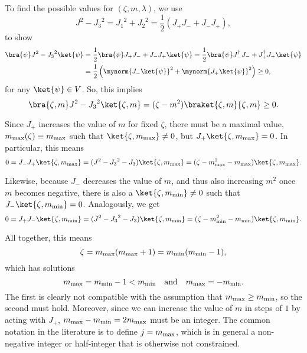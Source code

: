 To find the possible values for $(\zeta, m, \lambda)$, we use
\begin{equation*}
    J^2 - {J_3}^2 = {J_1}^2 + {J_2}^2 = \frac{1}{2} (J_+ J_- + J_- J_+),
\end{equation*}
to show
\begin{equation*}
\begin{split}
    \bra{\psi} J^2 - {J_3}^2 \ket{\psi} &= \frac{1}{2} \bra{\psi} J_+ J_- + J_- J_+ \ket{\psi} = \frac{1}{2} \bra{\psi} J^\dagger_- J_- + J_+^\dagger J_+ \ket{\psi} \\ &= \frac{1}{2} \left( \mynorm{J_- \ket{\psi}}^2 + \mynorm{J_+ \ket{\psi}}^2  \right) \geq 0 ,
\end{split}
\end{equation*}
for any $\ket{\psi} \in V$. So, this implies
\begin{equation*}
    \bra{\zeta, m } J^2 - {J_3}^2 \ket{\zeta,m} = (\zeta - m^2) \braket{\zeta,m}{\zeta,m} \geq 0 .
\end{equation*}

Since $J_+$ increases the value of $m$ for fixed $\zeta$, there must be a maximal value, $m_\textup{max}(\zeta) \equiv m_\textup{max}$ such that $\ket{\zeta, m_\textup{max}} \neq 0$, but $J_+ \ket{\zeta, m_\textup{max}} = 0$. In particular, this means
\begin{equation*}
    0 = J_- J_+ \ket{\zeta, m_\textup{max}} = (J^2 - {J_3}^2 - J_3) \ket{\zeta, m_\textup{max}} = (\zeta - m^2_\textup{max} - m_\textup{max}) \ket{\zeta, m_\textup{max}} .
\end{equation*}

Likewise, because $J_-$ decreases the value of $m$, and thus also increasing $m^2$ once $m$ becomes negative, there is also a $\ket{\zeta, m_\textup{min}} \neq 0$ such that $J_- \ket{\zeta, m_\textup{min}} = 0$. Analogously, we get
\begin{equation*}
    0 = J_+ J_- \ket{\zeta, m_\textup{min}} = (J^2 - {J_3}^2 - J_3) \ket{\zeta, m_\textup{min}} = (\zeta - m^2_\textup{min} - m_\textup{min}) \ket{\zeta, m_\textup{min}} .
\end{equation*}

All together, this means
\begin{equation}
    \zeta = m_\textup{max} (m_\textup{max} + 1) = m_\textup{min} (m_\textup{min} - 1),
\end{equation}
which has solutions
\begin{equation*}
    m_\textup{max} = m_\textup{min} - 1 < m_\textup{min} \quad \textup{and} \quad m_\textup{max} = - m_\textup{min}.
\end{equation*}
The first is clearly not compatible with the assumption that $m_\textup{max} \geq m_\textup{min}$, so the second must hold. Moreover, since we can increase the value of $m$ in steps of $1$ by acting with $J_+$, $m_\textup{max} - m_\textup{min} = 2 m_\textup{max}$ must be an integer. The common notation in the literature is to define $j = m_\textup{max}$, which is in general a non-negative integer or half-integer that is otherwise not constrained.

